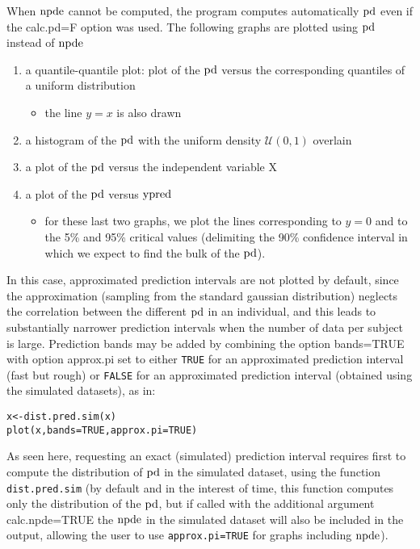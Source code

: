 When ${\rm npde}$ cannot be computed, the program computes automatically ${\rm pd}$ even if the {\sf calc.pd=F} option was used. The following graphs are plotted using ${\rm pd}$ instead of ${\rm npde}$
\begin{enumerate}
\item a quantile-quantile plot: plot of the ${\rm pd}$ versus the corresponding quantiles of a uniform distribution
   \begin{itemize}
   \item the line $y=x$ is also drawn
   \end{itemize}
\item a histogram of the ${\rm pd}$ with the uniform density $\mathcal{U}(0,1)$ overlain
\item a plot of the ${\rm pd}$ versus the independent variable X
\item a plot of the ${\rm pd}$ versus ${\rm ypred}$
   \begin{itemize}
   \item for these last two graphs, we plot the lines corresponding to $y=0$ and to the 5\% and 95\% critical values (delimiting the 90\% confidence interval in which we expect to find the bulk of the ${\rm pd}$).
   \end{itemize}
\end{enumerate}
In this case, approximated prediction intervals are not plotted by default, since the approximation (sampling from the standard gaussian distribution) neglects the correlation between the different ${\rm pd}$ in an individual, and this leads to substantially narrower prediction intervals when the number of data per subject is large. Prediction bands may be added by combining the option {\sf bands=TRUE} with option {\sf approx.pi} set to either \texttt{TRUE} for an approximated prediction interval (fast but rough) or \texttt{FALSE} for an approximated prediction interval (obtained using the simulated datasets), as in:
\begin{verbatim}
x<-dist.pred.sim(x)
plot(x,bands=TRUE,approx.pi=TRUE)
\end{verbatim}
As seen here, requesting an exact (simulated) prediction interval requires first to compute the distribution of ${\rm pd}$ in the simulated dataset, using the function \texttt{dist.pred.sim} (by default and in the interest of time, this function computes only the distribution of the ${\rm pd}$, but if called with the additional argument {\sf calc.npde=TRUE} the ${\rm npde}$ in the simulated dataset will also be included in the output, allowing the user to use \texttt{approx.pi=TRUE} for graphs including ${\rm npde}$).


